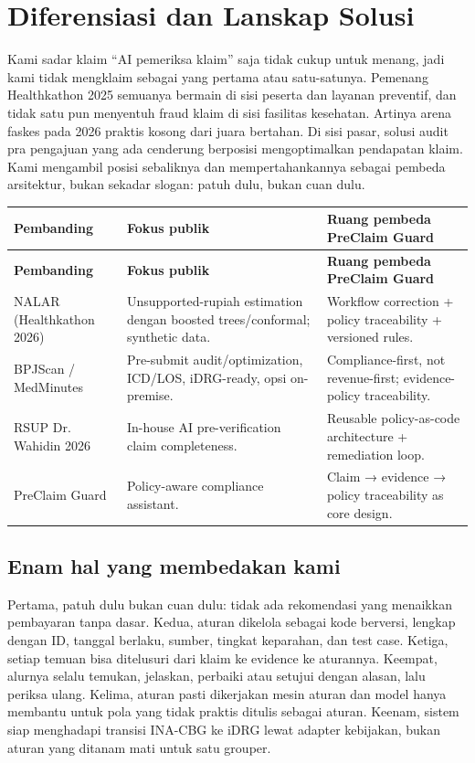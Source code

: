 \documentclass[11pt,a4paper]{article}
\begin{document}
\section{Diferensiasi dan Lanskap Solusi}
Kami sadar klaim ``AI pemeriksa klaim'' saja tidak cukup untuk menang, jadi kami tidak mengklaim sebagai yang pertama atau satu-satunya. Pemenang Healthkathon 2025 semuanya bermain di sisi peserta dan layanan preventif, dan tidak satu pun menyentuh fraud klaim di sisi fasilitas kesehatan. Artinya arena faskes pada 2026 praktis kosong dari juara bertahan. Di sisi pasar, solusi audit pra pengajuan yang ada cenderung berposisi mengoptimalkan pendapatan klaim. Kami mengambil posisi sebaliknya dan mempertahankannya sebagai pembeda arsitektur, bukan sekadar slogan: patuh dulu, bukan cuan dulu.
\begin{longtable}{|p{4cm}|p{6cm}|p{5cm}|}
\hline
\rowcolor{blue!15} \textbf{Pembanding} & \textbf{Fokus publik} & \textbf{Ruang pembeda PreClaim Guard} \\ \hline
\endfirsthead
\hline
\rowcolor{blue!15} \textbf{Pembanding} & \textbf{Fokus publik} & \textbf{Ruang pembeda PreClaim Guard} \\ \hline
\endhead
NALAR (Healthkathon 2026) & Unsupported-rupiah estimation dengan boosted trees/conformal; synthetic data. & Workflow correction + policy traceability + versioned rules. \\ \hline
BPJScan / MedMinutes & Pre-submit audit/optimization, ICD/LOS, iDRG-ready, opsi on-premise. & Compliance-first, not revenue-first; evidence-policy traceability. \\ \hline
RSUP Dr. Wahidin 2026 & In-house AI pre-verification claim completeness. & Reusable policy-as-code architecture + remediation loop. \\ \hline
PreClaim Guard & Policy-aware compliance assistant. & Claim → evidence → policy traceability as core design. \\ \hline
\end{longtable}
\subsection{Enam hal yang membedakan kami}
Pertama, patuh dulu bukan cuan dulu: tidak ada rekomendasi yang menaikkan pembayaran tanpa dasar. Kedua, aturan dikelola sebagai kode berversi, lengkap dengan ID, tanggal berlaku, sumber, tingkat keparahan, dan test case. Ketiga, setiap temuan bisa ditelusuri dari klaim ke evidence ke aturannya. Keempat, alurnya selalu temukan, jelaskan, perbaiki atau setujui dengan alasan, lalu periksa ulang. Kelima, aturan pasti dikerjakan mesin aturan dan model hanya membantu untuk pola yang tidak praktis ditulis sebagai aturan. Keenam, sistem siap menghadapi transisi INA-CBG ke iDRG lewat adapter kebijakan, bukan aturan yang ditanam mati untuk satu grouper.
\end{document}
